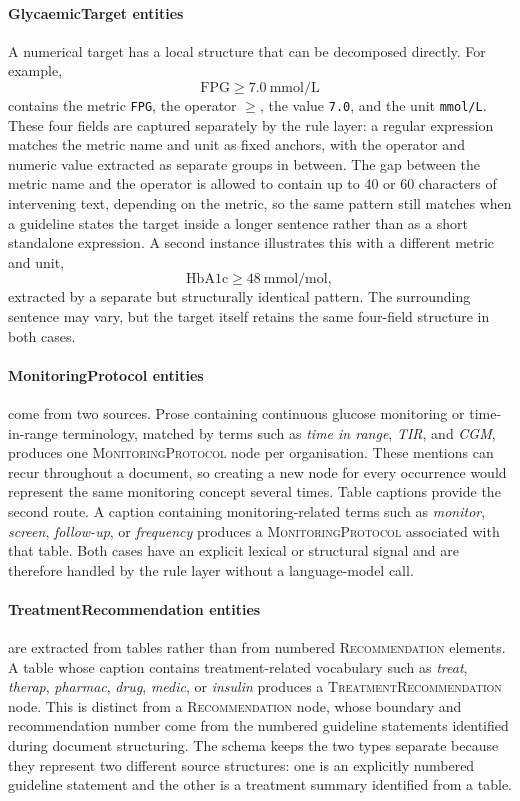 \paragraph{GlycaemicTarget entities}
A numerical target has a local structure that can be decomposed directly.
For example,
\[
\text{FPG} \geq 7.0~\text{mmol/L}
\]
contains the metric \texttt{FPG}, the operator $\geq$, the value
\texttt{7.0}, and the unit \texttt{mmol/L}. These four fields are captured
separately by the rule layer: a regular expression matches the metric
name and unit as fixed anchors, with the operator and numeric value
extracted as separate groups in between. The gap between the metric
name and the operator is allowed to contain up to 40 or 60 characters
of intervening text, depending on the metric, so the same pattern still
matches when a guideline states the target inside a longer sentence
rather than as a short standalone expression. A second instance
illustrates this with a different metric and unit,
\[
\text{HbA1c} \geq 48~\text{mmol/mol},
\]
extracted by a separate but structurally identical pattern. The
surrounding sentence may vary, but the target itself retains the same
four-field structure in both cases.

\paragraph{MonitoringProtocol entities}
come from two sources. Prose containing continuous glucose monitoring
or time-in-range terminology, matched by terms such as
\textit{time in range}, \textit{TIR}, and \textit{CGM}, produces one
\textsc{MonitoringProtocol} node per organisation. These mentions can
recur throughout a document, so creating a new node for every occurrence
would represent the same monitoring concept several times. Table captions
provide the second route. A caption containing monitoring-related terms
such as \textit{monitor}, \textit{screen}, \textit{follow-up}, or
\textit{frequency} produces a \textsc{MonitoringProtocol} associated
with that table. Both cases have an explicit lexical or structural signal
and are therefore handled by the rule layer without a language-model call.

\paragraph{TreatmentRecommendation entities}
are extracted from tables rather than from numbered
\textsc{Recommendation} elements. A table whose caption contains
treatment-related vocabulary such as \textit{treat}, \textit{therap},
\textit{pharmac}, \textit{drug}, \textit{medic}, or \textit{insulin}
produces a \textsc{TreatmentRecommendation} node. This is distinct from
a \textsc{Recommendation} node, whose boundary and recommendation number
come from the numbered guideline statements identified during document
structuring. The schema keeps the two types separate because they
represent two different source structures: one is an explicitly numbered
guideline statement and the other is a treatment summary identified from
a table.

